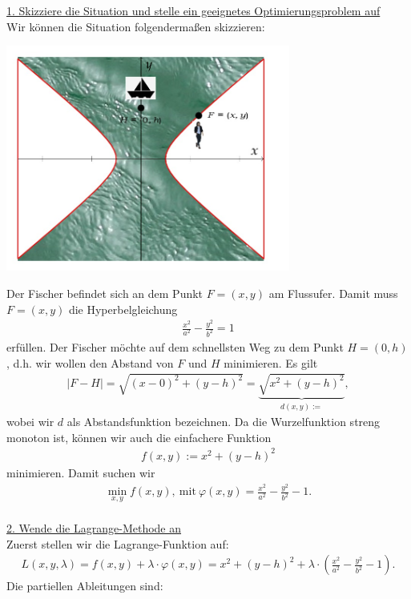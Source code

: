\underline{1. Skizziere die Situation und stelle ein geeignetes Optimierungsproblem auf}\\
Wir können die Situation folgendermaßen skizzieren:
\begin{center}
	\includegraphics[width=0.7\textwidth]{pictures/1_c}
\end{center}
Der Fischer befindet sich an dem Punkt $ F= (x,y) $ am Flussufer.
Damit muss $ F = (x,y) $ die Hyperbelgleichung
\begin{align*}
	\frac{x^2}{a^2}- \frac{y^2}{b^2} = 1
\end{align*} 
erfüllen. Der Fischer möchte auf dem schnellsten Weg zu dem Punkt $ H = (0,h) $, d.h. wir wollen den Abstand von $ F  $ und $ H $ minimieren.
Es gilt
\begin{align*}
	| F - H |
	= 
	\sqrt{(x-0)^2 + (y-h)^2}
	=
	\underbrace{\sqrt{x^2 + (y-h)^2}}_{d(x,y) :=},
\end{align*}
wobei wir $ d $ als Abstandsfunktion bezeichnen.
Da die Wurzelfunktion streng monoton ist, können wir auch die einfachere Funktion 
\begin{align*}
	f(x,y) := x^2 + (y-h)^2 
\end{align*}
minimieren. Damit suchen wir
\begin{align*}
	\min \limits_{x,y} f(x,y) , \ \textrm{mit} \ \varphi(x,y) = \frac{x^2}{a^2} -\frac{y^2}{b^2} -1.
\end{align*}
\ \\
\underline{2. Wende die Lagrange-Methode an}\\
Zuerst stellen wir die Lagrange-Funktion auf:
\begin{align*}
	L(x,y, \lambda )
	= 
	f(x,y) + \lambda\cdot \varphi(x,y)
	=
	x^2 + (y-h)^2 + \lambda \cdot
	\left(\frac{x^2}{a^2} - \frac{y^2}{b^2} -1\right).
\end{align*}
Die partiellen Ableitungen sind:
